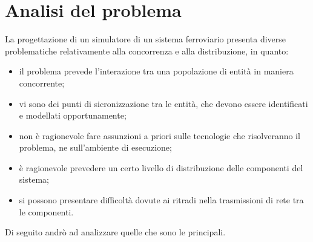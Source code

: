\chapter{Analisi del problema}

La progettazione di un simulatore di un sistema ferroviario presenta diverse problematiche relativamente alla concorrenza e alla distribuzione, in quanto:
\begin{itemize}
	\item il problema prevede l'interazione tra una popolazione di entità in maniera concorrente;
	\item vi sono dei punti di sicronizzazione tra le entità, che devono essere identificati e modellati opportunamente;
	\item non è ragionevole fare assunzioni a priori sulle tecnologie che risolveranno il problema, ne sull'ambiente di esecuzione;
	\item è ragionevole prevedere un certo livello di distribuzione delle componenti del sistema;
	\item si possono presentare difficoltà dovute ai ritradi nella trasmissioni di rete tra le componenti.
\end{itemize} 

Di seguito andrò ad analizzare quelle che sono le principali. 



